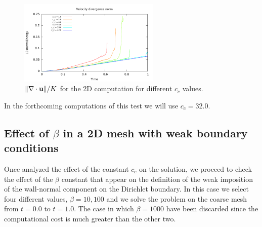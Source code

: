 \begin{figure}[h!]
  \centering
  \includegraphics[width=0.6\textwidth]{Figures/Chapter8/strong/divel}
  \caption{$\|\nabla\cdot{\bf u}\|/K$ for the 2D computation for different $ c_c $ values.}
  \label{fig-NACA_c_c_divel}
\end{figure}
In the forthcoming computations of this test we will use $ c_c=32.0 $.

\subsection{Effect of $ \beta $ in a 2D mesh with weak boundary conditions}
Once analyzed the effect of the constant $ c_c $ on the solution, we proceed to check the effect of the $ \beta $ constant that appear on the definition of the weak imposition of the wall-normal component on the Dirichlet boundary. In this case we select four different values, $ \beta={10,100} $ and we solve the problem on the coarse mesh from $ t=0.0 $ to $ t=1.0 $. The case in which $ \beta=1000 $ have been discarded since the computational cost is much greater than the other two.

